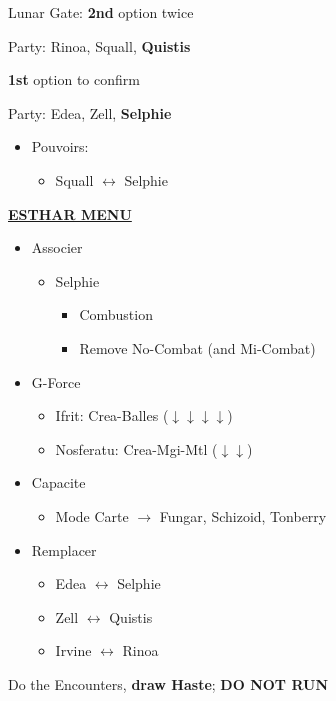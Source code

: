 Lunar Gate: \textbf{2nd} option twice

Party: Rinoa, Squall, \textbf{Quistis}

\textbf{1st} option to confirm

Party: Edea, Zell, \textbf{Selphie}
\begin{itemize}
	\item Pouvoirs:
		\begin{itemize}
			\item Squall $\leftrightarrow$ Selphie
		\end{itemize}
\end{itemize}

\newpage
\underline{\textbf{ESTHAR MENU}}

\begin{menu}
	\begin{itemize}
		\item Associer
			\begin{itemize}
				\item Selphie
					\begin{itemize}
						\item Combustion
						\item Remove No-Combat (and Mi-Combat)
					\end{itemize}
			\end{itemize}
		\item G-Force
			\begin{itemize}
				\item Ifrit: Crea-Balles ($\downarrow\downarrow\downarrow\downarrow$)
				\item Nosferatu: Crea-Mgi-Mtl ($\downarrow\downarrow$)
			\end{itemize}
		\item Capacite
			\begin{itemize}
				\item Mode Carte $\rightarrow$ Fungar, Schizoid, Tonberry
			\end{itemize}
		\item Remplacer
			\begin{itemize}
				\item Edea $\leftrightarrow$ Selphie
				\item Zell $\leftrightarrow$ Quistis
				\item Irvine $\leftrightarrow$ Rinoa
			\end{itemize}
	\end{itemize}
\end{menu}

Do the Encounters, \textbf{draw Haste}; \textbf{DO NOT RUN}

